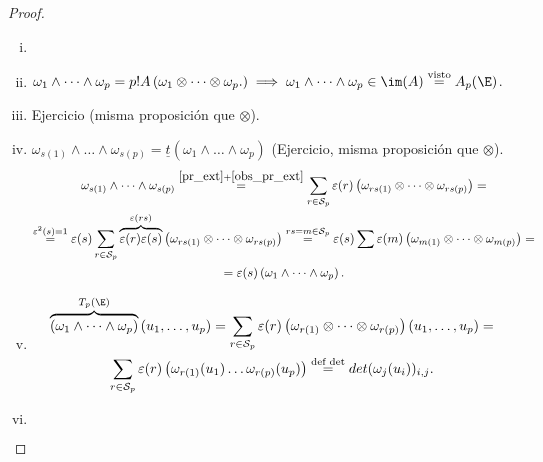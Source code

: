 \begin{proof}
    \begin{enumerate}[i)]
    \item[]
    \item
        $ \omega_1 \wedge \dots \wedge \omega_p = p!  A\left(\omega_1
        \otimes \dots \otimes \omega_p . \right) \implies \omega_1
        \wedge \dots \wedge \omega_p \in \im(A) \stackrel{\text{visto}}{=}
        A_p(\E) $.
    \item
        Ejercicio (misma proposición que $ \otimes $).
    \item
        $ \omega_{s(1)} \wedge \dots \wedge \omega_{s(p)} = \underline{t}
        (\omega_1 \wedge \dots \wedge \omega_p) $ (Ejercicio, misma
        proposición que $ \otimes $).
        \begin{gather*}
            \omega_{s(1)} \wedge \dots \wedge \omega_{s(p)} \stackrel{%
            \ref{pr_ext} +%
            \ref{obs_pr_ext}}{=} \sum_{r \in \mathcal{S}_p} \varepsilon(r)
            \left( \omega_{rs(1)} \otimes \dots \otimes \omega_{rs(p)}
            \right) = \\
            \stackrel{\varepsilon^2(s)=1}{=} \varepsilon(s) \sum_{r \in
            \mathcal{S}_p} \overbrace{\varepsilon(r) \varepsilon(s)}^{\varepsilon
            (rs)} \left( \omega_{rs(1)} \otimes \dots \otimes\omega_{rs(p)}
            \right) \stackrel{rs = m \in \mathcal{S}_p}{=} \varepsilon(s)
            \sum \varepsilon(m) \left( \omega_{m(1)} \otimes \dots
            \otimes \omega_{m(p)} \right) = \\
            = \varepsilon(s) \left( \omega_1 \wedge \dots \wedge \omega_p
            \right).
        \end{gather*}
    \item
        \begin{gather*}
            \overbrace{\left( \omega_1 \wedge \dots \wedge \omega_p
            \right)}^{T_p(\E)} \left(u_1,\dots,u_p \right) = \sum_{r\in\mathcal
            {S}_p} \varepsilon(r) \left( \omega_{r(1)} \otimes \dots
            \otimes \omega_{r(p)} \right) \left( u_1,\dots,u_p \right) =
            \\
            \sum_{r \in \mathcal{S}_p} \varepsilon(r) \left( \omega_{r(1)}
            (u_1) \dots \omega_{r(p)}(u_p) \right) \stackrel{\text{def
            det}}{=} det(\omega_j(u_i))_{i,j}.
        \end{gather*}
    \item
        \begin{gather*}

\end{gather*}
\end{enumerate}
\end{proof}
